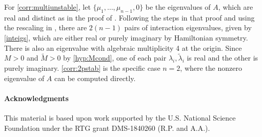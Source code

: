\documentclass[12pt]{elsarticle}
\begin{document}
For \cref{corr:multiunstable}, let $\{ \mu_1,\dots,\mu_{n-1}, 0\}$ be the eigenvalues of $A$, which are real and distinct as in the proof of \cite[Theorem 5]{Parker2020}. Following the steps in that proof and using the rescaling in \cite[Theorem 3]{Sandstede1998}, there are $2(n-1)$ pairs of interaction eigenvalues, given by \cref{inteigs}, which are either real or purely imaginary by Hamiltonian symmetry. There is also an eigenvalue with algebraic multiplicity 4 at the origin. Since $M > 0$ and $\tilde{M} > 0$ by \cref{hyp:Mcond}, one of each pair $\lambda_i, \tilde{\lambda}_i$ is real and the other is purely imaginary. \cref{corr:2pstab} is the specific case $n = 2$, where the nonzero eigenvalue of $A$ can be computed directly.

\paragraph{Acknowledgments}

This material is based upon work supported by the U.S. National Science Foundation under the RTG grant DMS-1840260 (R.P. and A.A.).


\end{document}
